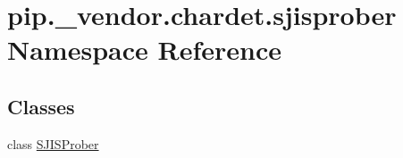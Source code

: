 \hypertarget{namespacepip_1_1__vendor_1_1chardet_1_1sjisprober}{}\section{pip.\+\_\+vendor.\+chardet.\+sjisprober Namespace Reference}
\label{namespacepip_1_1__vendor_1_1chardet_1_1sjisprober}
\subsection*{Classes}
\begin{DoxyCompactItemize}
\item 
class \hyperlink{classpip_1_1__vendor_1_1chardet_1_1sjisprober_1_1SJISProber}{S\+J\+I\+S\+Prober}
\end{DoxyCompactItemize}
